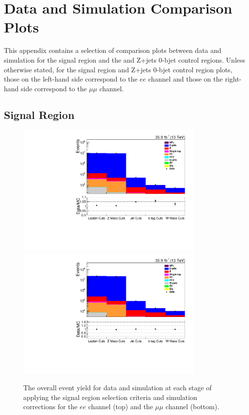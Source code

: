 \chapter{Data and Simulation Comparison Plots}\label{app:plots}
This appendix contains a selection of comparison plots between data and simulation for the signal region and the \ttbar and Z+jets 0-bjet control regions.
Unless otherwise stated, for the signal region and Z+jets 0-bjet control region plots, those on the left-hand side correspond to the $ee$ channel and those on the right-hand side correspond to the $\mu\mu$ channel.

\clearpage
\newpage

\section{Signal Region}\label{appSec:signalRegionPlots}
\begin{figure}[!h]
\centering
\includegraphics[width=0.83\textwidth]{figs/background-estimation/plots/unblinded/prompt_ee_ttbarInc/cutFlow_log.pdf}
\\
\includegraphics[width=0.83\textwidth]{figs/background-estimation/plots/unblinded/prompt_mumu_ttbarInc/cutFlow_log.pdf}
\caption{
The overall event yield for data and simulation at each stage of applying the signal region selection criteria and simulation corrections for the $ee$ channel (top) and the $\mu\mu$ channel (bottom).
}
\label{fig:SR_cutFlow}
\end{figure}

